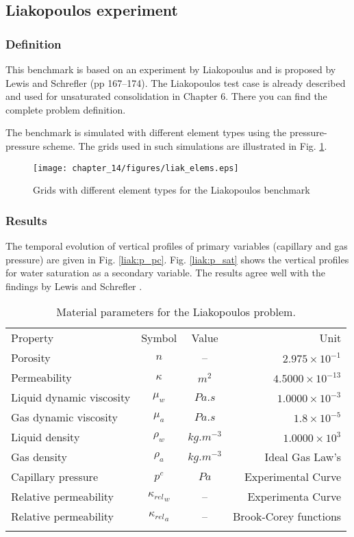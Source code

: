 \subsection{Liakopoulos experiment}

\subsubsection*{Definition}
This benchmark is based on an experiment by Liakopoulus \cite{Lia:65} and is proposed by Lewis and Schrefler \cite{LewSch:98}(pp 167--174). The Liakopoulos test case is already described and used for unsaturated consolidation in Chapter 6. There you can find the complete problem definition.

The benchmark is simulated with different element types using the pressure-pressure scheme. The grids used in such simulations are illustrated in Fig. \ref{liak:grids}.

\begin{figure}[!thb]
\begin{center}
\texttt{[image: chapter\_14/figures/liak\_elems.eps]}
\end{center}
\caption{Grids with different element types for the Liakopoulos benchmark}
\label{liak:grids}
\end{figure}

\subsubsection*{Results}
The temporal evolution of vertical profiles of primary variables (capillary and gas pressure) are given in Fig. \ref{liak:p_pc}. Fig. \ref{liak:p_sat} shows the vertical profiles for water saturation as a secondary variable. The results agree well with the findings by Lewis and Schrefler \cite{LewSch:98}.

\begin{table}[!htb]
\begin{tabular}{lccr}
\hline\hline\noalign{\smallskip}
Property & Symbol & Value & Unit \\
\noalign{\smallskip}\hline\noalign{\smallskip}
Porosity & $n$ & -- & $2.975\times10^{-1}$ \\
Permeability & $\kappa$ & $ m^2$ & $4.5000\times 10^{-13}$ \\
Liquid dynamic viscosity &  $\mu_w$ & $Pa.s$ & $1.0000\times10^{-3}$ \\
Gas dynamic viscosity & $\mu_a$ & $Pa.s$ & $1.8\times10^{-5}$ \\
Liquid density &  $\rho_w$ &$kg.m^{-3}$ & $1.0000\times10^{3}$ \\
Gas density &  $\rho_a$ & $kg.m^{-3}$ & Ideal Gas Law's \\
Capillary pressure & $p^c$ & $Pa$ & Experimental Curve \\
Relative permeability & ${\kappa_{rel}}_{w}$ & -- & Experimenta Curve\\
Relative permeability & ${\kappa_{rel}}_{a}$ & -- & Brook-Corey functions \\
\noalign{\smallskip}\hline\hline
\end{tabular}
\caption{Material parameters for the Liakopoulos problem.}
\end{table}

